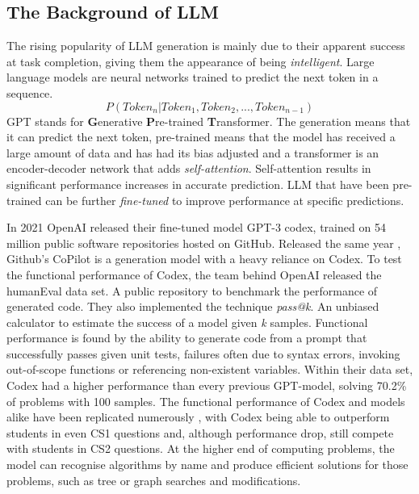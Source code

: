 \documentclass[manuscript,screen,review,sigconf]{acmart}
\begin{document}
\subsection{The Background of LLM}
The rising popularity of LLM generation is mainly due to their apparent success at task completion, giving them the appearance of being \textit{intelligent}. Large language models are neural networks trained to predict the next token in a sequence.
\[P(Token_n|Token_1,Token_2,...,Token_{n-1})\]
GPT stands for \textbf{G}enerative \textbf{P}re-trained \textbf{T}ransformer. The generation means that it can predict the next token, pre-trained means that the model has received a large amount of data and has had its bias adjusted and a transformer is an encoder-decoder network that adds \textit{self-attention}. Self-attention results in significant performance increases in accurate prediction. LLM that have been pre-trained can be further \textit{fine-tuned} to improve performance at specific predictions.


In 2021 OpenAI released their fine-tuned model GPT-3 codex, trained on 54 million public software repositories hosted on GitHub\cite{CodexRelPaper}. Released the same year \cite{GitHub_2021}, Github's CoPilot is a generation model with a heavy reliance on Codex. To test the functional performance of Codex, the team behind OpenAI released the humanEval data set. A public repository to benchmark the performance of generated code. They also implemented the technique \textit{pass@k}. An unbiased calculator to estimate the success of a model given \textit{k} samples. Functional performance is found by the ability to generate code from a prompt that successfully passes given unit tests, failures often due to syntax errors, invoking out-of-scope functions or referencing non-existent variables. Within their data set, Codex had a higher performance than every previous GPT-model, solving 70.2\% of problems with 100 samples. The functional performance of Codex and models alike have been replicated numerously \cite{SysEvaOfLLMofCode, PerformanceParsonProblems, CopilotSuggestionsEval, CoPilotForTeaching}, with Codex being able to outperform students in even CS1 questions and, although performance drop, still compete with students in CS2 questions\cite{Codex_CS1_CS2_Test}. At the higher end of computing problems, the model can recognise algorithms by name and produce efficient solutions for those problems, such as tree or graph searches and modifications.
\end{document}
